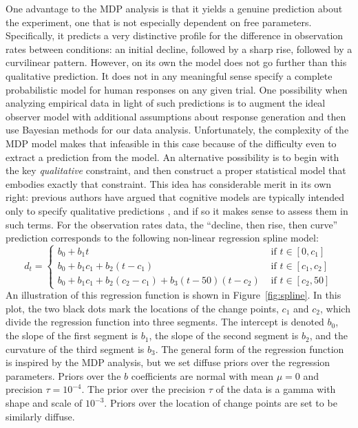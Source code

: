 \documentclass[authoryear]{elsarticle}
\begin{document}
One advantage to the MDP analysis is that it yields a genuine prediction about the experiment, one that is not especially dependent on free parameters. Specifically, it predicts a very distinctive profile for the difference in observation rates between conditions: an initial decline, followed by a sharp rise, followed by a curvilinear pattern. However, on its own the model does not go further than this qualitative prediction. It does not in any meaningful sense specify a complete probabilistic model for human responses on any given trial. One possibility when analyzing empirical data in light of such predictions is to augment the ideal observer model with additional assumptions about response generation \citep[e.g.,][]{navarro_sampling_2012,hemmer_moving_INPRESS} and then use Bayesian methods for our data analysis. Unfortunately, the complexity of the MDP model makes that infeasible in this case because of the difficulty even to extract a prediction from the model. An alternative possibility is to begin with the key {\it qualitative} constraint, and then construct a proper statistical model that embodies exactly that constraint. This idea has considerable merit in its own right: previous authors have argued that cognitive models are typically intended only to specify qualitative predictions \citep{pitt_global_2006}, and if so it makes sense to assess them in such terms. For the observation rates data, the ``decline, then rise, then curve'' prediction corresponds to the following non-linear regression spline model:
$$
d_t = \left\{ \begin{array}{ll}
b_0 + b_1 t & \mbox{ if }  t  \in [0, c_1] \\
b_0 + b_1 c_1 + b_2 (t-c_1) & \mbox{ if }  t \in [c_1, c_2]  \\
b_0 + b_1 c_1 + b_2 (c_2-c_1) + b_3 (t-50)(t-c_2)& \mbox{ if }  t \in [c_2, 50]
\end{array} \right.
$$
An illustration of this regression function is shown in Figure~\ref{fig:spline}. In this plot, the two black dots mark the locations of the change points, $c_1$ and $c_2$, which divide the regression function into three segments. The intercept is denoted $b_0$, the slope of the first segment is $b_1$, the slope of the second segment is $b_2$, and the curvature of the third segment is $b_3$. The general form of the regression function is inspired by the MDP analysis, but we set diffuse priors over the regression parameters. Priors over the $b$ coefficients are normal with mean $\mu=0$ and precision $\tau=10^{-4}$. The prior over the precision $\tau$ of the data is a gamma with shape and scale of $10^{-3}$. Priors over the location of change points are set to be similarly diffuse.
\end{document}
